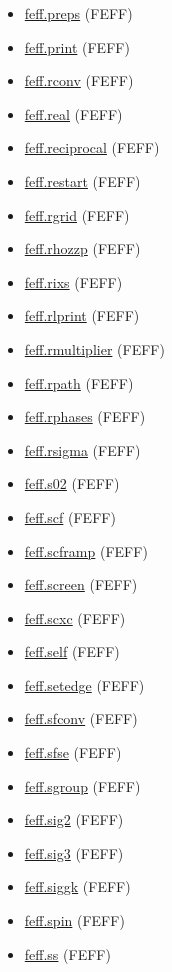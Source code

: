 \documentclass[11pt]{article}
\begin{document}
\begin{itemize}
\item \hyperref[kw:feff-preps]{feff.preps} (FEFF)
\item \hyperref[kw:feff-print]{feff.print} (FEFF)
\item \hyperref[kw:feff-rconv]{feff.rconv} (FEFF)
\item \hyperref[kw:feff-real]{feff.real} (FEFF)
\item \hyperref[kw:feff-reciprocal]{feff.reciprocal} (FEFF)
\item \hyperref[kw:feff-restart]{feff.restart} (FEFF)
\item \hyperref[kw:feff-rgrid]{feff.rgrid} (FEFF)
\item \hyperref[kw:feff-rhozzp]{feff.rhozzp} (FEFF)
\item \hyperref[kw:feff-rixs]{feff.rixs} (FEFF)
\item \hyperref[kw:feff-rlprint]{feff.rlprint} (FEFF)
\item \hyperref[kw:feff-rmultiplier]{feff.rmultiplier} (FEFF)
\item \hyperref[kw:feff-rpath]{feff.rpath} (FEFF)
\item \hyperref[kw:feff-rphases]{feff.rphases} (FEFF)
\item \hyperref[kw:feff-rsigma]{feff.rsigma} (FEFF)
\item \hyperref[kw:feff-s02]{feff.s02} (FEFF)
\item \hyperref[kw:feff-scf]{feff.scf} (FEFF)
\item \hyperref[kw:feff-scframp]{feff.scframp} (FEFF)
\item \hyperref[kw:feff-screen]{feff.screen} (FEFF)
\item \hyperref[kw:feff-scxc]{feff.scxc} (FEFF)
\item \hyperref[kw:feff-self]{feff.self} (FEFF)
\item \hyperref[kw:feff-setedge]{feff.setedge} (FEFF)
\item \hyperref[kw:feff-sfconv]{feff.sfconv} (FEFF)
\item \hyperref[kw:feff-sfse]{feff.sfse} (FEFF)
\item \hyperref[kw:feff-sgroup]{feff.sgroup} (FEFF)
\item \hyperref[kw:feff-sig2]{feff.sig2} (FEFF)
\item \hyperref[kw:feff-sig3]{feff.sig3} (FEFF)
\item \hyperref[kw:feff-siggk]{feff.siggk} (FEFF)
\item \hyperref[kw:feff-spin]{feff.spin} (FEFF)
\item \hyperref[kw:feff-ss]{feff.ss} (FEFF)

\end{itemize}
\end{document}
